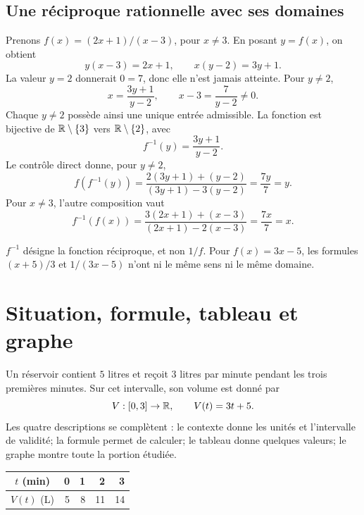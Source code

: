 \subsection*{Une réciproque rationnelle avec ses domaines}
Prenons \(f(x)=(2x+1)/(x-3)\), pour \(x\ne3\). En posant \(y=f(x)\), on obtient
\[
y(x-3)=2x+1,\qquad x(y-2)=3y+1.
\]
La valeur \(y=2\) donnerait \(0=7\), donc elle n'est jamais atteinte. Pour \(y\ne2\),
\[
x=\frac{3y+1}{y-2},\qquad x-3=\frac7{y-2}\ne0.
\]
Chaque \(y\ne2\) possède ainsi une unique entrée admissible. La fonction est bijective de \(\mathbb{R}\setminus\{3\}\) vers \(\mathbb{R}\setminus\{2\}\), avec
\[
f^{-1}(y)=\frac{3y+1}{y-2}.
\]
Le contrôle direct donne, pour \(y\ne2\),
\[
f(f^{-1}(y))=
\frac{2(3y+1)+(y-2)}{(3y+1)-3(y-2)}=
\frac{7y}{7}=y.
\]
Pour \(x\ne3\), l'autre composition vaut
\[
f^{-1}(f(x))=
\frac{3(2x+1)+(x-3)}{(2x+1)-2(x-3)}=
\frac{7x}{7}=x.
\]

\begin{warningbox}
\(f^{-1}\) désigne la fonction réciproque, et non \(1/f\). Pour \(f(x)=3x-5\), les formules \((x+5)/3\) et \(1/(3x-5)\) n'ont ni le même sens ni le même domaine.
\end{warningbox}

\section{Situation, formule, tableau et graphe}
\label{manual:section:03.06}

Un réservoir contient \(5\) litres et reçoit \(3\) litres par minute pendant les trois premières minutes. Sur cet intervalle, son volume est donné par
\[
V:[0,3]\to\mathbb{R},\qquad V(t)=3t+5.
\]
Les quatre descriptions se complètent : le contexte donne les unités et l'intervalle de validité; la formule permet de calculer; le tableau donne quelques valeurs; le graphe montre toute la portion étudiée.

\begin{center}
\begin{tabular}{c|rrrr}
\(t\) (min) & 0 & 1 & 2 & 3\\
\hline
\(V(t)\) (L) & 5 & 8 & 11 & 14
\end{tabular}
\quad
{}
\end{center}

